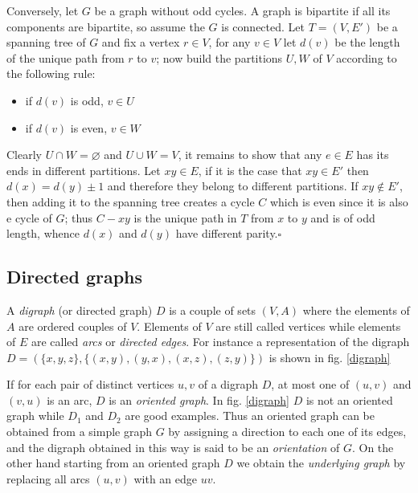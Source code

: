 \documentclass[a4paper,12pt,oneside]{book}
\newcommand*{\QED}{\hfill\ensuremath{\square}}
\let\emptyset\varnothing
\begin{document}
Conversely, let $G$ be a graph without odd cycles. A graph is bipartite if all its components are bipartite, so assume the $G$ is connected. Let $T=(V,E')$ be a spanning tree of $G$ and fix a vertex $r\in V$, for any $v\in V$ let $d(v)$ be the length of the unique path from $r$ to $v$; now build the partitions $U,W$ of $V$ according to the following rule:
\begin{itemize}
\item if $d(v)$ is odd, $v\in U$
\item if $d(v)$ is even, $v\in W$
\end{itemize} 
Clearly $U\cap W =\emptyset$ and $U\cup W=V$, it remains to show that any $e\in E$ has its ends in different partitions. 
Let $xy\in E$, if it is the case that $xy\in E'$ then $d(x)=d(y)\pm 1$ and therefore they belong to different partitions. If $xy\notin E'$, then adding it to the spanning tree creates a cycle $C$ which is even since it is also e cycle of $G$; thus $C-xy$ is the unique path in $T$ from $x$ to $y$ and is of odd length, whence $d(x)$ and $d(y)$ have different parity.\QED


\subsection*{Directed graphs}

A \textit{digraph} (or directed graph) $D$  is a couple of sets $(V,A)$ where the elements of $A$ are ordered couples of $V$. Elements of $V$ are still called vertices while elements of $E$ are called \textit{arcs} or \textit{directed edges}. For instance a representation of the digraph $D=(\{x,y,z\}, \{(x,y),(y,x),(x,z),(z,y)\})$ is shown in fig. \ref{digraph}

If for each pair of distinct vertices $u,v$ of a digraph $D$, at most one of $(u,v)$ and $(v,u)$ is an arc, $D$ is an \textit{oriented graph}. In fig. \ref{digraph} $D$ is not an oriented graph while $D_1$ and $D_2$ are good examples. Thus an oriented graph can be obtained from a simple graph $G$ by assigning a direction to each one of its edges, and the digraph obtained in this way is said to be an \textit{orientation} of $G$. On the other hand starting from an oriented graph $D$ we obtain the \textit{underlying graph } by replacing all arcs $(u,v)$ with an edge $uv$. 
\end{document}
